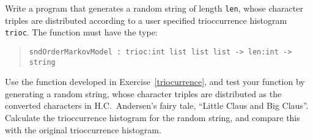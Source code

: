 Write a program that generates a random string of length
\lstinline!len!, whose character triples are distributed according to a
user specified trioccurrence histogram \lstinline!trioc!.  The function
must have the type:
\begin{quote}
  \mbox{\lstinline!sndOrderMarkovModel : trioc:int list list list -> len:int -> string!}
\end{quote}
Use the function developed in Exercise~\ref{triocurrence}, and test
your function by generating a random string, whose character triples are
distributed as the converted characters in H.C.\ Andersen's fairy
tale, ``Little Claus and Big Claus''. Calculate the trioccurrence
histogram for the random string, and compare this with the original
trioccurrence histogram.
